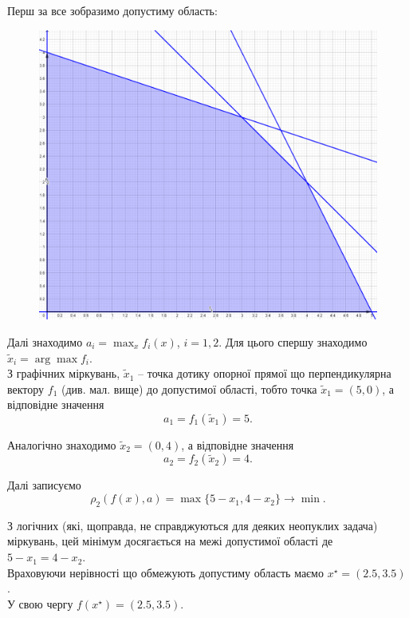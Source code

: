 \begin{solution}
    Перш за все зобразимо допустиму область:
    \begin{figure}[H]
        \centering
        \includegraphics[width=\textwidth]{img/ideal_point_3.png}
    \end{figure}
    
    Далі знаходимо $a_i = \max_x f_i(x)$, $i = 1, 2$. Для цього спершу знаходимо $\tilde x_i = \arg \max f_i$. \\
    
    З графічних міркувань, $\tilde x_1$ -- точка дотику опорної прямої що перпендикулярна вектору $f_1$ (див. мал. вище) до допустимої області, тобто точка $\tilde x_1 = \left( 5, 0 \right)$, а відповідне значення \[ a_1 = f_1(\tilde x_1) = 5. \]
    
    Аналогічно знаходимо $\tilde x_2 = \left( 0, 4 \right)$, а відповідне значення \[ a_2 = f_2(\tilde x_2) = 4. \]
    
    Далі записуємо \[ \rho_2(f(x), a) = \max\{ 5 - x_1, 4 - x_2\} \to \min. \]
    
    З логічних (які, щоправда, не справджуються для деяких неопуклих задача) міркувань, цей мінімум досягається на межі допустимої області де $5 - x_1 = 4 - x_2$. \\
    
    Враховуючи нерівності що обмежують допустиму область маємо $x^\star = \left( 2.5, 3.5 \right)$. \\
    
    У свою чергу $f(x^\star) = \left( 2.5, 3.5 \right)$.
\end{solution}

\newpage